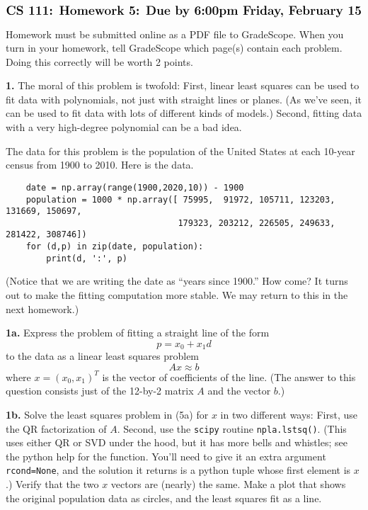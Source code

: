 \documentclass[11pt]{article}
\begin{document}
$$\mbox{\Large \bf CS 111: Homework 5: Due by 6:00pm Friday, February 15}$$
\par\bigskip\noindent
Homework must be submitted online as a PDF file to GradeScope.
When you turn in your homework, 
tell GradeScope which page(s) contain each problem. 
Doing this correctly will be worth 2 points.

\par\bigskip
{\bf 1.}
The moral of this problem is twofold: 
First, linear least squares can be used to fit data with polynomials,
not just with straight lines or planes.
(As we've seen, it can be used to fit data with lots of different kinds of models.)
Second, fitting data with a very high-degree polynomial can be a bad idea.

The data for this problem is the population of the United States at each
10-year census from 1900 to 2010. Here is the data.
\begin{verbatim}
    date = np.array(range(1900,2020,10)) - 1900
    population = 1000 * np.array([ 75995,  91972, 105711, 123203, 131669, 150697, 
                                  179323, 203212, 226505, 249633, 281422, 308746])
    for (d,p) in zip(date, population):
        print(d, ':', p)
\end{verbatim}
(Notice that we are writing the date as ``years since 1900.''
How come?
It turns out to make the fitting computation more stable.
We may return to this in the next homework.)

\par\medskip
{\bf 1a.}
Express the problem of fitting a straight line of the form
$$ p = x_0 + x_1d$$
to the data as a linear least squares problem
$$A x \approx b$$
where $x = (x_0, x_1)^T$ is the vector of coefficients of the line.
(The answer to this question consists just of the 12-by-2 matrix $A$ 
and the vector $b$.)

\par\medskip
{\bf 1b.}
Solve the least squares problem in (5a) for $x$ in two different ways:
First, use the QR factorization of $A$.
Second, use the {\tt scipy} routine {\tt npla.lstsq()}.
(This uses either QR or SVD under the hood, but it has more
bells and whistles; see the python help for the function.
You'll need to give it an extra argument {\tt rcond=None},
and the solution it returns is a python tuple whose first element is $x$.)
Verify that the two $x$ vectors are (nearly) the same.
Make a plot that shows the original population data as circles,
and the least squares fit as a line.
\end{document}
